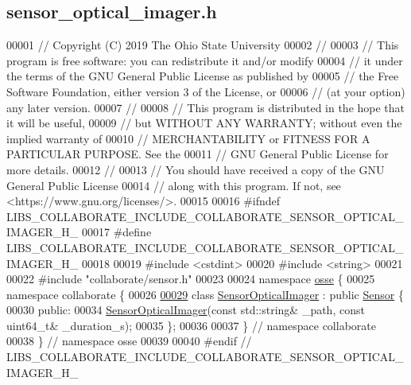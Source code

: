\hypertarget{sensor__optical__imager_8h_source}{}\subsection{sensor\+\_\+optical\+\_\+imager.\+h}
\label{sensor__optical__imager_8h_source}

\begin{DoxyCode}
00001 \textcolor{comment}{// Copyright (C) 2019 The Ohio State University}
00002 \textcolor{comment}{//}
00003 \textcolor{comment}{// This program is free software: you can redistribute it and/or modify}
00004 \textcolor{comment}{// it under the terms of the GNU General Public License as published by}
00005 \textcolor{comment}{// the Free Software Foundation, either version 3 of the License, or}
00006 \textcolor{comment}{// (at your option) any later version.}
00007 \textcolor{comment}{//}
00008 \textcolor{comment}{// This program is distributed in the hope that it will be useful,}
00009 \textcolor{comment}{// but WITHOUT ANY WARRANTY; without even the implied warranty of}
00010 \textcolor{comment}{// MERCHANTABILITY or FITNESS FOR A PARTICULAR PURPOSE.  See the}
00011 \textcolor{comment}{// GNU General Public License for more details.}
00012 \textcolor{comment}{//}
00013 \textcolor{comment}{// You should have received a copy of the GNU General Public License}
00014 \textcolor{comment}{// along with this program.  If not, see <https://www.gnu.org/licenses/>.}
00015 
00016 \textcolor{preprocessor}{#ifndef LIBS\_COLLABORATE\_INCLUDE\_COLLABORATE\_SENSOR\_OPTICAL\_IMAGER\_H\_}
00017 \textcolor{preprocessor}{#define LIBS\_COLLABORATE\_INCLUDE\_COLLABORATE\_SENSOR\_OPTICAL\_IMAGER\_H\_}
00018 
00019 \textcolor{preprocessor}{#include <cstdint>}
00020 \textcolor{preprocessor}{#include <string>}
00021 
00022 \textcolor{preprocessor}{#include "collaborate/sensor.h"}
00023 
00024 \textcolor{keyword}{namespace }\hyperlink{namespaceosse}{osse} \{
00025 \textcolor{keyword}{namespace }collaborate \{
00026 
\hyperlink{classosse_1_1collaborate_1_1_sensor_optical_imager}{00029} \textcolor{keyword}{class }\hyperlink{classosse_1_1collaborate_1_1_sensor_optical_imager}{SensorOpticalImager} : \textcolor{keyword}{public} \hyperlink{classosse_1_1collaborate_1_1_sensor}{Sensor} \{
00030  \textcolor{keyword}{public}:
00034   \hyperlink{classosse_1_1collaborate_1_1_sensor_optical_imager_adee811f8926a698d9a56815742575259}{SensorOpticalImager}(\textcolor{keyword}{const} std::string& \_path, \textcolor{keyword}{const} uint64\_t& \_duration\_s);
00035 \};
00036 
00037 \}  \textcolor{comment}{// namespace collaborate}
00038 \}  \textcolor{comment}{// namespace osse}
00039 
00040 \textcolor{preprocessor}{#endif  // LIBS\_COLLABORATE\_INCLUDE\_COLLABORATE\_SENSOR\_OPTICAL\_IMAGER\_H\_}
\end{DoxyCode}
